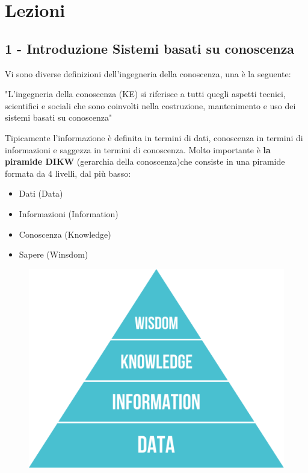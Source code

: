 \documentclass[a4paper]{extarticle}
\begin{document}
\newpage 
\section{Lezioni}

\subsection{1 - Introduzione Sistemi basati su conoscenza}

Vi sono diverse definizioni dell'ingegneria della conoscenza, una è la seguente:

\begin{center}
	"L'ingegneria della conoscenza (KE) si riferisce a tutti quegli aspetti tecnici, scientifici e sociali che sono coinvolti nella costruzione, mantenimento e uso dei sistemi basati su conoscenza"
\end{center}

Tipicamente l'informazione è definita in termini di dati, conoscenza in termini di informazioni e saggezza in termini di conoscenza. Molto importante è \textbf{la piramide DIKW} (gerarchia della conoscenza)che consiste in una piramide formata da 4 livelli, dal più basso:
\begin{itemize}
	\item Dati (Data)
	\item  Informazioni (Information)
	\item Conoscenza (Knowledge)
	\item Sapere (Winsdom)
\end{itemize}

\begin{figure}[h]
\begin{center}
\includegraphics[scale=.3]{wkid.png}
\end{center}

\end{figure}
\end{document}

